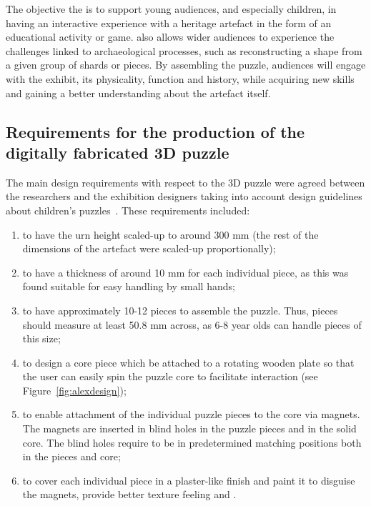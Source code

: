 \documentclass[acmlarge,screen,dvipsnames]{acmart}
\begin{document}
 The objective  the  is to support young
audiences, and especially children, in having an interactive experience with a heritage artefact in the form of an educational
activity or game.  \KRedit[will] also allows wider audiences to experience the
challenges linked to archaeological processes, such as reconstructing
a shape from a given group of shards or pieces. By assembling the
puzzle, audiences will engage with the exhibit, its physicality,
function and history, while acquiring new skills and gaining a better
understanding about the artefact itself.

\subsection{Requirements for the production of the digitally fabricated 3D puzzle}

The main design requirements with respect to the 3D puzzle were agreed
between the researchers and the exhibition designers taking into
account design guidelines about children's
puzzles~\cite{Smith2002}. These requirements included:
%
\begin{enumerate}
\item to have the urn height scaled-up to around 300 mm (the rest of
  the dimensions of the artefact were scaled-up proportionally);
\item to have a thickness of around 10 mm for each individual piece,
  as this was found suitable for easy handling by small hands;
\item to have approximately 10-12 pieces to assemble the puzzle. Thus,
  pieces should measure at least 50.8 mm across, as 6-8 year olds can
  handle pieces of this size;
\item to design a core piece which  be attached to a rotating
  wooden plate so that the user can easily spin the puzzle core to
  facilitate interaction (see Figure~\ref{fig:alexdesign});
\item to enable attachment of the individual puzzle pieces to the core
  via magnets. The magnets are inserted in blind holes in the puzzle
  pieces and in the solid core. The blind holes require to be in
  predetermined matching positions both in the pieces and core;
\item to cover each individual piece in a plaster-like finish and
  paint it to disguise the magnets, provide better texture feeling and
  .
\end{enumerate} 
\end{document}
